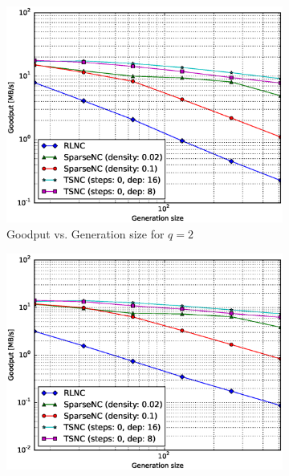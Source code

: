 \begin{figure}
    \centering
    \begin{subfigure}[b]{0.475\textwidth}
        \centering
        \includegraphics[width=1.15\textwidth]{images/23_07_2015/goodput_vs_generation_size_Rasp_encoder_Binary_1600.eps}
        \caption[]%
        {{\small Goodput vs. Generation size for $q = 2$}}    
        \label{fig:enc_good_rasp1_gen_gf2}
    \end{subfigure}
    \hfill
    \begin{subfigure}[b]{0.475\textwidth}  
        \centering 
        \includegraphics[width=1.15\textwidth]{images/23_07_2015/goodput_vs_generation_size_Rasp_encoder_Binary8_1600.eps}

\end{subfigure}
\end{figure}
